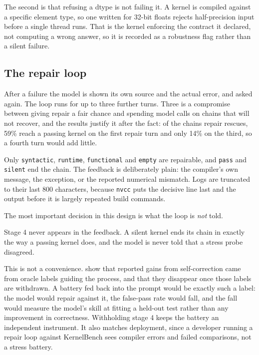 \documentclass[12pt]{article}
\begin{document}
The second is that refusing a dtype is not failing it. A kernel is compiled
against a specific element type, so one written for 32-bit floats rejects
half-precision input before a single thread runs. That is the kernel enforcing
the contract it declared, not computing a wrong answer, so it is recorded as a
robustness flag rather than a silent failure.

\subsection{The repair loop}
\label{sec:repairloop}

After a failure the model is shown its own source and the actual error, and
asked again. The loop runs for up to three further turns. Three is a
compromise between giving repair a fair chance and spending model calls on
chains that will not recover, and the results justify it after the fact: of the
chains repair rescues, 59\% reach a passing kernel on the first repair turn and
only 14\% on the third, so a fourth turn would add little.

Only \texttt{syntactic}, \texttt{runtime}, \texttt{functional} and
\texttt{empty} are repairable, and \texttt{pass} and \texttt{silent} end the
chain. The feedback is deliberately plain: the compiler's own message, the
exception, or the reported numerical mismatch. Logs are truncated to their last 800
characters, because \texttt{nvcc} puts the decisive line last and the output
before it is largely repeated build commands.

The most important decision in this design is what the loop is \emph{not}
told.

Stage 4 never appears in the feedback. A silent kernel ends its chain in
exactly the way a passing kernel does, and the model is never told that a
stress probe disagreed.

This is not a convenience. \citet{huang2024cannot} show that reported gains
from self-correction came from oracle labels guiding the process, and that they
disappear once those labels are withdrawn. A battery fed back into the prompt
would be exactly such a label: the model would repair against it, the
false-pass rate would fall, and the fall would measure the model's skill at
fitting a held-out test rather than any improvement in correctness. Withholding
stage 4 keeps the battery an independent instrument. It also matches
deployment, since a developer running a repair loop against KernelBench sees
compiler errors and failed comparisons, not a stress battery.
\end{document}
